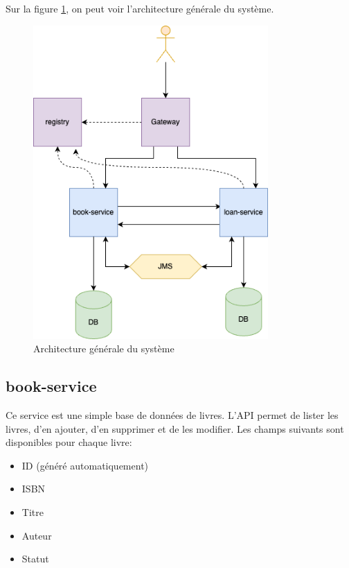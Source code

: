 \documentclass[
  french,
  a4paper,
]{scrartcl}
\begin{document}
Sur la figure \ref{fig:architecture}, on peut voir l'architecture générale du système.

\begin{figure}[h]
    \centering
    \includegraphics[width=0.8\textwidth]{img/neolib.png}
    \caption{Architecture générale du système}
    \label{fig:architecture}
\end{figure}

\subsection{book-service}

Ce service est une simple base de données de livres. L'API permet de lister les livres,
d'en ajouter, d'en supprimer et de les modifier. Les champs suivants sont disponibles pour
chaque livre:

\begin{itemize}
    \item ID (généré automatiquement)
    \item ISBN
    \item Titre
    \item Auteur
    \item Statut
\end{itemize}
\end{document}
